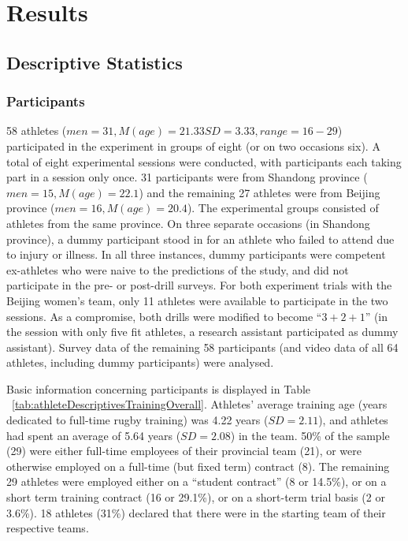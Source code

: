 \clearpage
\section{Results}


\subsection{Descriptive Statistics \label{sec:descriptives}}

\subsubsection{Participants}
58 athletes ($men = 31, M(age) = 21.33 SD = 3.33, range = 16-29$) participated in the experiment in groups of eight (or on two occasions six).  A total of eight experimental sessions were conducted, with participants each taking part in a session only once.  31 participants were from Shandong province ($men = 15, M(age) = 22.1$) and the remaining 27 athletes were from Beijing province ($men = 16, M(age) = 20.4$).  The experimental groups consisted of athletes from the same province. On three separate occasions (in Shandong province), a dummy participant stood in for an athlete who failed to attend due to injury or illness.  In all three instances, dummy participants were competent ex-athletes who were naive to the predictions of the study, and did not participate in the pre- or post-drill surveys. For both experiment trials with the Beijing women's team, only 11 athletes were available to participate in the two sessions.  As a compromise, both drills were modified to become ``$3+2+1$'' (in the session with only five fit athletes, a research assistant participated as dummy assistant).  Survey data of the remaining 58 participants (and video data of all 64 athletes, including dummy participants) were analysed.



Basic information concerning participants is displayed in Table ~\ref{tab:athleteDescriptivesTrainingOverall}.  Athletes' average training age (years dedicated to full-time rugby training) was 4.22 years ($SD = 2.11$), and athletes had spent an average of 5.64 years ($SD = 2.08$) in the team.  50\% of the sample (29) were either full-time employees of their provincial team (21), or were otherwise employed on a full-time (but fixed term) contract (8).  The remaining 29 athletes were employed either on a ``student contract'' (8 or 14.5\%), or on a short term training contract (16 or 29.1\%), or on a short-term trial basis (2 or 3.6\%).  18 athletes (31\%) declared that there were in the starting team of their respective teams.

